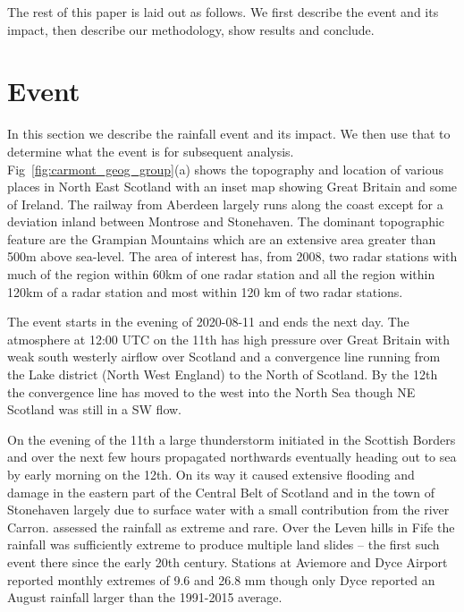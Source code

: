 \documentclass[11pt,a4paper]{article}
\begin{document}
The rest of this paper is laid out as follows. We first describe the event and its impact, then describe our methodology, show results and conclude. 

\section{Event}

In this section we describe the rainfall event and its impact. We then use that to determine what the event is for subsequent analysis. Fig~\ref{fig:carmont_geog_group}(a) shows the topography and location of various places in North East Scotland with an inset map showing Great Britain and some of Ireland. The railway from Aberdeen largely runs along the coast except for a deviation inland between Montrose and Stonehaven.  The dominant topographic feature are the Grampian Mountains which are an extensive area greater than 500m above sea-level. The area of interest has, from 2008, two radar stations with much of the region within 60km of one radar station and  all the region within 120km of a radar station and most within 120 km of two radar stations. 

  The event starts in the evening of 2020-08-11 and ends the next day. The atmosphere  at 12:00 UTC on the 11th has high pressure over Great Britain with weak south westerly airflow over Scotland and a convergence line running from the Lake district (North West England) to the North of Scotland\parencite{pritchard2020weather}. By the 12th the convergence line has moved to the west into the North Sea though NE Scotland was still in a SW flow. 

On  the evening of the 11th  a large thunderstorm initiated in the Scottish Borders and over the next few hours propagated northwards eventually heading out to sea by early morning on the 12th\parencite{Kendon2020thunderstrorms_report}. On its way it caused extensive flooding and damage in the eastern part of the Central Belt of Scotland\parencite{SEPA2020report_floods,kendon2021ukclimate} and in the town of Stonehaven largely due to surface water with a small contribution from the river Carron. \cite{SEPA2020report_floods} assessed the rainfall as  extreme and rare. Over the Leven hills in Fife the rainfall was sufficiently extreme to produce multiple land slides -- the first such event there since the early 20th century\parencite{Kirkbride2021}.  Stations at Aviemore and Dyce Airport\parencite{pritchard2020weather} reported monthly extremes of 9.6 and 26.8 mm though only Dyce reported an August rainfall larger than the 1991-2015 average. 
\end{document}
